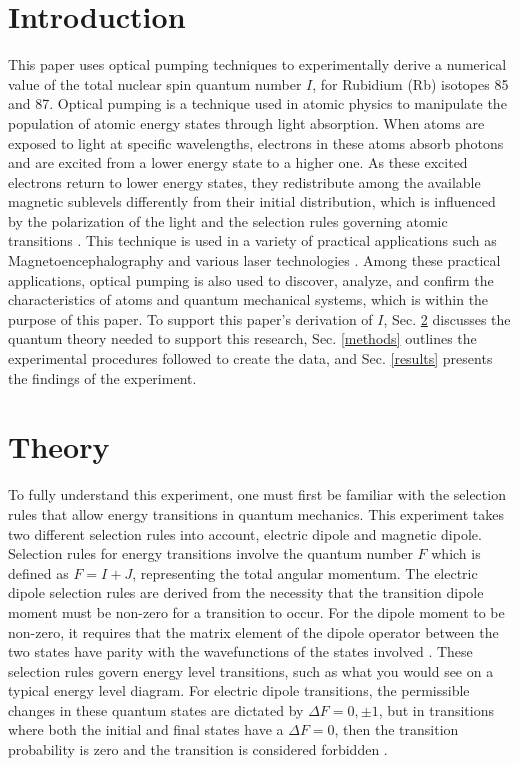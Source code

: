 \documentclass[
 reprint,
linenumbers,
aps,amsmath
]{revtex4-2}
\begin{document}

\section{\label{Intro}Introduction}%

This paper uses optical pumping techniques to experimentally derive a numerical value of the total nuclear spin quantum number $I$, for Rubidium (Rb) isotopes 85 and 87. Optical pumping is a technique used in atomic physics to manipulate the population of atomic energy states through light absorption. When atoms are exposed to light at specific wavelengths, electrons in these atoms absorb photons and are excited from a lower energy state to a higher one. As these excited electrons return to lower energy states, they redistribute among the available magnetic sublevels differently from their initial distribution, which is influenced by the polarization of the light and the selection rules governing atomic transitions \cite{Optical_Pumping_Happer}. This technique is used in a variety of practical applications such as Magnetoencephalography \cite{MEG_example} and various laser technologies \cite{Laser_Example}. Among these practical applications, optical pumping is also used to discover, analyze, and confirm the characteristics of atoms and quantum mechanical systems, which is within the purpose of this paper. To support this paper's derivation of $I$, Sec. \ref{Theory} discusses the quantum theory needed to support this research, Sec. \ref{methods} outlines the experimental procedures followed to create the data, and Sec. \ref{results} presents the findings of the experiment.

\section{Theory} \label{Theory}

To fully understand this experiment, one must first be familiar with the selection rules that allow energy transitions in quantum mechanics. This experiment takes two different selection rules into account, electric dipole and magnetic dipole. Selection rules for energy transitions involve the quantum number $F$ which is defined as $F=I+J$, representing the total angular momentum. The electric dipole selection rules are derived from the necessity that the transition dipole moment must be non-zero for a transition to occur. For the dipole moment to be non-zero, it requires that the matrix element of the dipole operator between the two states have parity with the wavefunctions of the states involved \cite{McIntyre-QM,Foot_AtomicPhys}. These selection rules govern energy level transitions, such as what you would see on a typical energy level diagram. For electric dipole transitions, the permissible changes in these quantum states are dictated by $\Delta F = 0, \pm 1$, but in transitions where both the initial and final states have a $\Delta F = 0$, then the transition probability is zero and the transition is considered forbidden \cite{McIntyre-QM}. 
\end{document}
